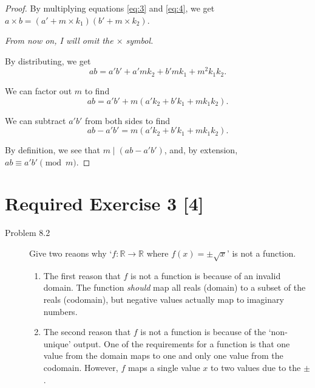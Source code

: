 \documentclass{article}
\begin{document}
\begin{enumerate}
{\begin{proof}
            By multiplying equations \ref{eq:3} and \ref{eq:4}, we get 
            \(a \times b = (a' + m\times k_1) (b' + m\times k_2)\).

            \textit{From now on, I will omit the \(\times\) symbol.}

            By distributing, we get 
            \[ab = a'b' + a'mk_2 + b'mk_1 + m^2k_1k_2.\]
            
            We can factor out \(m\) to find 
            \[ab = a'b' + m(a'k_2 + b'k_1 + mk_1k_2).\]

            We can subtract \(a'b'\) from both sides to find 
            \[ab - a'b' = m(a'k_2 + b'k_1 + mk_1k_2).\]

            By definition, we see that \(m \mid (ab - a'b')\), and, by extension, 
            \(ab \equiv a'b' \pmod{m}\).
                
        \end{proof}
    }
\end{enumerate}

\section*{Required Exercise 3 [4]}

\begin{description}
    \item[Problem 8.2] {
        Give two reaons why `\(f: \mathbb{R} \rightarrow \mathbb{R}\) where 
        \(f(x) = \pm \sqrt{x}\)' is not a function.

        \begin{enumerate}
            \item {
                The first reason that \(f\) is not a function is because of an invalid 
                domain. The function \textit{should} map all reals (domain) to a subset 
                of the reals (codomain), but negative values actually map to imaginary 
                numbers.
            }

            \item {
                The second reason that \(f\) is not a function is because of the 
                `non-unique' output. One of the requirements for a function is that 
                one value from the domain maps to one and only one value from the 
                codomain. However, \(f\) maps a single value \(x\) to two values due to 
                the \(\pm\). 
            }
        \end{enumerate}
    }
\end{description}
\end{document}
